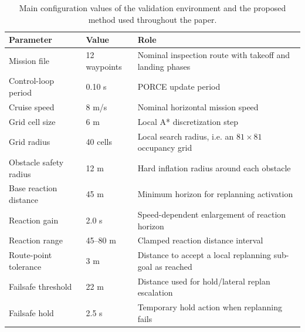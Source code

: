 \documentclass[drones,article,submit,moreauthors]{Definitions/mdpi}
\begin{document}
\begin{table}[h!]
    \centering
    \small
    \begin{tabular}{@{}p{} p{} p{}@{}}
        \toprule
        \textbf{Parameter} & \textbf{Value} & \textbf{Role} \\
        \midrule
        Mission file & 12 waypoints & Nominal inspection route with takeoff and landing phases \\
        Control-loop period & 0.10 s & PORCE update period \\
        Cruise speed & 8 m/s & Nominal horizontal mission speed \\
        Grid cell size & 6 m & Local A* discretization step \\
        Grid radius & 40 cells & Local search radius, i.e. an $81 \times 81$ occupancy grid \\
        Obstacle safety radius & 12 m & Hard inflation radius around each obstacle \\
        Base reaction distance & 45 m & Minimum horizon for replanning activation \\
        Reaction gain & 2.0 s & Speed-dependent enlargement of reaction horizon \\
        Reaction range & 45--80 m & Clamped reaction distance interval \\
        Route-point tolerance & 3 m & Distance to accept a local replanning sub-goal as reached \\
        Failsafe threshold & 22 m & Distance used for hold/lateral replan escalation \\
        Failsafe hold & 2.5 s & Temporary hold action when replanning fails \\
        \bottomrule
    \end{tabular}
    \caption{Main configuration values of the validation environment and the proposed method used throughout the paper.}
    \label{tab:config}
\end{table}

\end{document}
